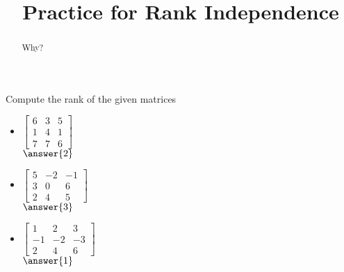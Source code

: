 \documentclass{ximera}
\title{Practice for Rank Independence}
\begin{document}
\begin{abstract}
Why?
\end{abstract}
\maketitle

\begin{exercise} \label{exercise:rankmatrix}
    Compute the rank of the given matrices
    \begin{itemize}
        \item
        $\begin{bmatrix}
            6 & 3 & 5 \\
            1 & 4 & 1 \\
            7 & 7 & 6
        \end{bmatrix}$\\ $\answer{2}$
        \item
        $\begin{bmatrix}
            5 & -2 & -1 \\
            3 & 0 & 6 \\
            2 & 4 & 5
        \end{bmatrix}$\\ $\answer{3}$
        \item
        $\begin{bmatrix}
            1 & 2 & 3 \\
            -1 & -2 & -3 \\
            2 & 4 & 6
        \end{bmatrix}$\\ $\answer{1}$
    \end{itemize}
\end{exercise}
\end{document}
